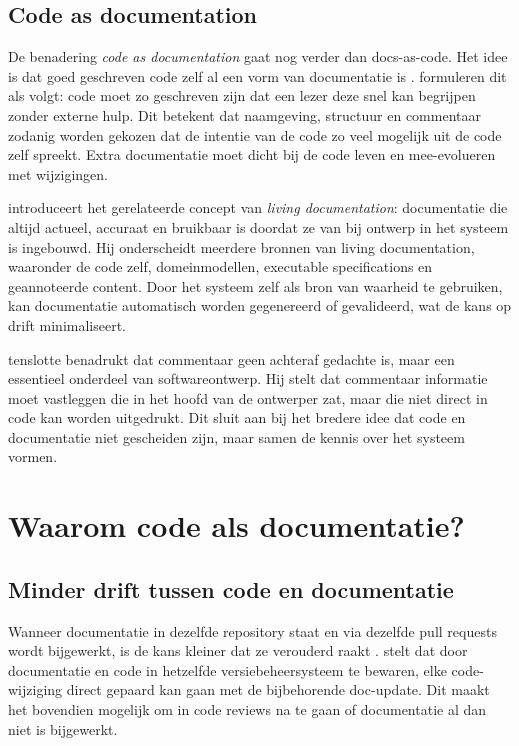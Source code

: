 \subsection{Code as documentation}
De benadering \textit{code as documentation} gaat nog verder dan docs-as-code. Het idee is dat goed geschreven code zelf al een vorm van documentatie is \autocite{boswell2011readablecode}. \textcite{boswell2011readablecode} formuleren dit als volgt: code moet zo geschreven zijn dat een lezer deze snel kan begrijpen zonder externe hulp. Dit betekent dat naamgeving, structuur en commentaar zodanig worden gekozen dat de intentie van de code zo veel mogelijk uit de code zelf spreekt. Extra documentatie moet dicht bij de code leven en mee-evolueren met wijzigingen.

\textcite{martraire2019livingdocumentation} introduceert het gerelateerde concept van \textit{living documentation}: documentatie die altijd actueel, accuraat en bruikbaar is doordat ze van bij ontwerp in het systeem is ingebouwd. Hij onderscheidt meerdere bronnen van living documentation, waaronder de code zelf, domeinmodellen, executable specifications en geannoteerde content. Door het systeem zelf als bron van waarheid te gebruiken, kan documentatie automatisch worden gegenereerd of gevalideerd, wat de kans op drift minimaliseert.

\textcite{ousterhout2018philosophy} tenslotte benadrukt dat commentaar geen achteraf gedachte is, maar een essentieel onderdeel van softwareontwerp. Hij stelt dat commentaar informatie moet vastleggen die in het hoofd van de ontwerper zat, maar die niet direct in code kan worden uitgedrukt. Dit sluit aan bij het bredere idee dat code en documentatie niet gescheiden zijn, maar samen de kennis over het systeem vormen.

\section{Waarom code als documentatie?}
\label{sec:cad-waarom}

\subsection{Minder drift tussen code en documentatie}
Wanneer documentatie in dezelfde repository staat en via dezelfde pull requests wordt bijgewerkt, is de kans kleiner dat ze verouderd raakt \autocite{gentle2017docslikecode}. \textcite{gentle2017docslikecode} stelt dat door documentatie en code in hetzelfde versiebeheersysteem te bewaren, elke code-wijziging direct gepaard kan gaan met de bijbehorende doc-update. Dit maakt het bovendien mogelijk om in code reviews na te gaan of documentatie al dan niet is bijgewerkt.

